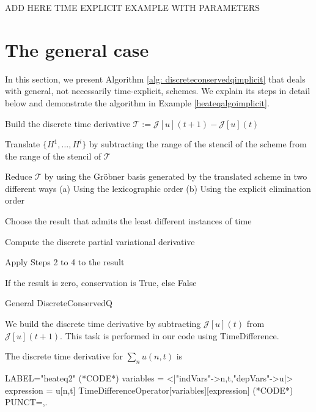 \documentclass[runningheads]{llncs}
\newcommand{\Rr}{\mathbb{R}}
\newcommand{\Nn}{\mathbb{N}}
\newcommand{\1}{\chi}
\newcommand{\Ii}{\mathcal{I}}
\begin{document}
{\color{red}ADD HERE TIME EXPLICIT EXAMPLE WITH PARAMETERS} 



\section{The general case}
\label{secgen}
In this section, we present Algorithm \ref{alg: discreteconservedqimplicit} that deals with general, not necessarily time-explicit, schemes. We explain its steps in detail below and demonstrate the algorithm in Example \ref{heateqalgoimplicit}.
\begin{algorithm}
	\DontPrintSemicolon
	\KwIn{$\mathcal{J}\in\mathcal{F}(\mathcal{P}(\Ii\times\Nn,\Rr^m),\mathcal{D}(\Nn))$ and $\{H^1,\ldots,H^i\}\subset\mathcal{S}(\mathcal{P}(\Ii\times\Nn,\Rr^m),\mathcal{P}(\Ii\times\Nn,\Rr))$ }
	
	\label{step1} Build the discrete time derivative $\mathcal{T}:=\mathcal{J}[u](t+1)-\mathcal{J}[u](t)$\;
	
	\label{step2}Translate $\{H^1,\ldots,H^i\}$ by subtracting the range of the stencil of the scheme from the range of the stencil of $\mathcal{T}$\;
	
	\label{step3} Reduce $\mathcal{T}$ by using {\color{red} the Gr{\"o}bner basis} generated by the translated scheme in two different ways
	\label{step3a} (a) Using the lexicographic order
	\label{step3b} (b) Using the explicit elimination order\;
	
	\label{step4} Choose the result that admits the least different instances of time\;
	
	\label{step5} Compute the discrete partial variational derivative\;
	
	\label{step6} Apply Steps 2 to 4 to the result\;
	
	\label{step7} If the result is zero, conservation is {\sc True}, else {\sc False}\;
	
	\caption{{\sc General DiscreteConservedQ}}
	\label{alg: discreteconservedqimplicit}
\end{algorithm}

We build the discrete time derivative by subtracting $\mathcal{J}[u](t)$ from $\mathcal{J}[u](t+1)$. This task is performed in our code using {\sc TimeDifference}.
\begin{example}
	The discrete time derivative for $\sum_n u(n,t)$ is
	\begin{EXE}
		LABEL="heateq2"
		(*CODE*)
		variables = <|"indVars"->{n,t},"depVars"->{u}|>
		expression = u[n,t]
		TimeDifferenceOperator[variables][expression]
		(*CODE*)
		PUNCT={,.}
	\end{EXE}
	
	\begin{small}
		
		
	\end{small}
\end{example}
	
\end{document}
